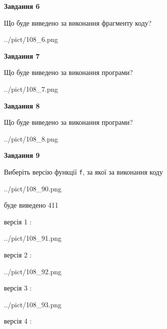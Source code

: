 \documentclass[12pt, ukrainian]{article}
\def\code#1{\Verb!#1!}
\begin{document}
{\begin {large}
{\begin {center}\textbf{Завдання 6}\end {center}}

Що буде виведено за виконання фрагменту коду?\par
\begin{center}
	{../pict/108_6.png}
\end{center}
\newpage

{\begin {center}\textbf{Завдання 7}\end {center}}

Що буде виведено за виконання програми?\par
\begin{center}
	{../pict/108_7.png}
\end{center}
\newpage

{\begin {center}\textbf{Завдання 8}\end {center}}

Що буде виведено за виконання програми?\par
\begin{center}
	{../pict/108_8.png}
\end{center}
\newpage

{\begin {center}\textbf{Завдання 9}\end {center}}

Виберіть версію функції \code{f}, за якої за виконання коду
\begin{center}
	{../pict/108_90.png}
\end{center}
буде виведено 411

\vspace{5mm}
версія 1 :

\begin{center}
	{../pict/108_91.png}
\end{center}
версія 2 :

\begin{center}
	{../pict/108_92.png}
\end{center}
версія 3 :

\begin{center}
	{../pict/108_93.png}
\end{center}
версія 4 :


\end{large}}
\end{document}
